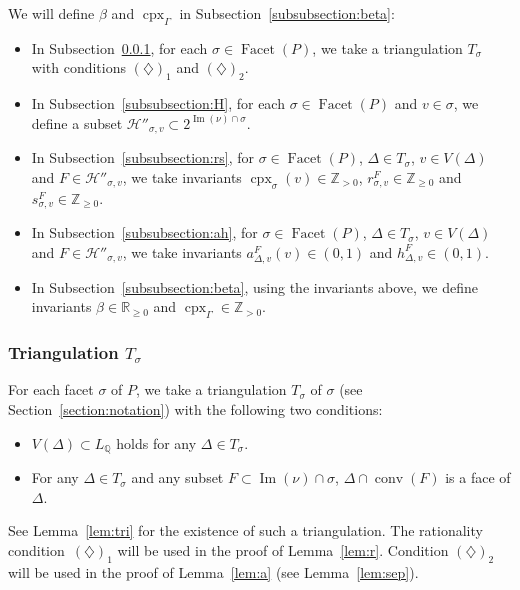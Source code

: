 \documentclass[11pt]{article}
\theoremstyle{definition}
\numberwithin{equation}{section}
\begin{document}
We will define $\beta$ and $\operatorname{cpx}_{\Gamma}$ in Subsection~\ref{subsubsection:beta}: 
\begin{itemize}
\item 
In Subsection~\ref{subsubsection:T}, for each $\sigma \in \operatorname{Facet}(P)$, 
we take a triangulation $T_{\sigma}$  with conditions $(\diamondsuit)_1$ and $(\diamondsuit)_2$. 

\item
In Subsection~\ref{subsubsection:H}, for each $\sigma \in \operatorname{Facet}(P)$ and $v \in \sigma$, 
we define a subset $\mathcal{H}'' _{\sigma, v} \subset 2 ^{\operatorname{Im}(\nu) \cap \sigma}$.

\item 
In Subsection~\ref{subsubsection:rs}, 
for $\sigma \in \operatorname{Facet}(P)$, $\Delta \in T_{\sigma}$, $v \in V(\Delta)$ and $F \in \mathcal{H}'' _{\sigma, v}$, 
we take invariants $\operatorname{cpx}_{\sigma}(v) \in \mathbb{Z}_{>0}$, $r^{F} _{\sigma, v} \in \mathbb{Z}_{\ge 0}$ and $s^{F} _{\sigma, v} \in \mathbb{Z}_{\ge 0}$. 

\item 
In Subsection~\ref{subsubsection:ah}, 
for $\sigma \in \operatorname{Facet}(P)$, $\Delta \in T_{\sigma}$, $v \in V(\Delta)$ and $F \in \mathcal{H}'' _{\sigma, v}$, 
we take invariants $a^{F} _{\Delta, v} (v) \in (0,1)$ and $h^F_{\Delta, v} \in (0,1)$. 

\item 
In Subsection~\ref{subsubsection:beta}, using the invariants above, 
we define invariants  $\beta \in \mathbb{R}_{\ge 0}$ and $\operatorname{cpx}_{\Gamma} \in \mathbb{Z}_{> 0}$. 
\end{itemize}


\subsubsection{Triangulation $T_{\sigma}$}\label{subsubsection:T}
For each facet $\sigma$ of $P$, we take a triangulation $T_{\sigma}$ of $\sigma$ (see Section~\ref{section:notation}) with the following two conditions: 
\begin{itemize}
\item[$(\diamondsuit) _1$]
$V(\Delta) \subset L_{\mathbb{Q}}$ holds for any $\Delta \in T_{\sigma}$. 

\item[$(\diamondsuit) _2$]
For any $\Delta \in T_{\sigma}$ and any subset $F \subset \operatorname{Im}(\nu) \cap \sigma$, 
$\Delta \cap \operatorname{conv}(F)$ is a face of $\Delta$. 
\end{itemize}
See Lemma~\ref{lem:tri} for the existence of such a triangulation. 
The rationality condition~$(\diamondsuit) _1$ will be used in the proof of Lemma~\ref{lem:r}. 
Condition $(\diamondsuit) _2$ will be used in the proof of Lemma~\ref{lem:a} (see Lemma~\ref{lem:sep}). 
\end{document}
